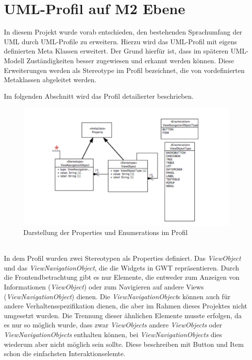 \chapter{UML-Profil auf M2 Ebene}
\label{UMLProfil}
In diesem Projekt wurde vorab entschieden, den bestehenden Sprachumfang der UML durch UML-Profile zu erweitern. Hierzu wird das UML-Profil mit eigens definierten Meta Klassen erweitert. Der Grund hierfür ist, dass im späteren UML-Modell Zuständigkeiten besser zugewiesen und erkannt werden können. Diese Erweiterungen werden als Stereotype im Profil bezeichnet, die von vordefinierten Metaklassen abgeleitet werden.

Im folgenden Abschnitt wird das Profil detailierter beschrieben.
\begin{figure}[htbp]
\begin{center}
\includegraphics[width=\textwidth]{./img/ProfilProp.pdf}
\caption{Darstellung der Properties und Enumerations im
Profil}\label{Fig:UMLProfilProp}
\end{center}
\end{figure}\\
In dem Profil wurden zwei Stereotypen als Properties definiert. Das \textit{ViewObject} und das \textit{ViewNavigationObject}, die die Widgets in GWT repräsentieren. Durch die Frontendbetrachtung gibt es nur Elemente, die entweder zum Anzeigen von Informationen (\textit{ViewObject}) oder zum Navigieren auf andere Views (\textit{ViewNavigationObject}) dienen. Die \textit{ViewNavigationObject}s können auch für andere Verhaltensspezifikation dienen, die aber im Rahmen dieses Projektes nicht umgesetzt wurden. Die Trennung dieser ähnlichen Elemente musste erfolgen, da es nur so möglich wurde, dass zwar \textit{ViewObjects} andere \textit{ViewObjects} oder  \textit{ViewNavigationObjects} enthalten können, bei \textit{ViewNavigationObjects} dies wiederum aber nicht möglich sein sollte. Diese beschreiben mit Button und Item schon die einfachsten Interaktionselemte.
